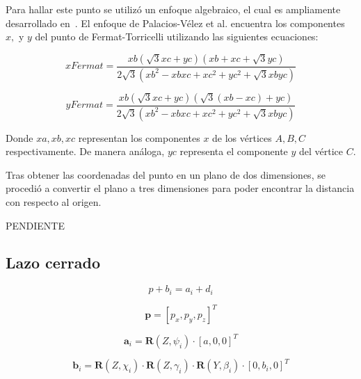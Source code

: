 \documentclass[titlepage, letterpaper, fleqn]{article}
\let\bs\mathbf
\begin{document}
Para hallar este punto se utilizó un enfoque algebraico, el cual es ampliamente desarrollado en~\cite{Palacios-Velez2015}.
El enfoque de Palacios-Vélez et al. encuentra los componentes $x,$ y $ y$ del punto de Fermat-Torricelli utilizando las siguientes ecuaciones:

\begin{equation}
    \label{eq:fermat_x}
    xFermat = \frac{xb(\sqrt{3}xc + yc)(xb + xc + \sqrt{3} yc)}{2\sqrt{3}(xb^2 - xb xc + xc^2 + yc^2 + \sqrt{3} xb yc)}
\end{equation}

\begin{equation}
    \label{eq:fermat_y}
    yFermat = \frac{xb(\sqrt{3}xc + yc)(\sqrt{3}(xb - xc) + yc)}{2\sqrt{3}(xb^2 - xb xc + xc^2 + yc^2 + \sqrt{3} xb yc)}
\end{equation}

Donde $xa, xb, xc$ representan los componentes $x$ de los vértices $A, B, C$ respectivamente.
De manera análoga, $yc$ representa el componente $y$ del vértice $C$.

Tras obtener las coordenadas del punto en un plano de dos dimensiones, se procedió a convertir el plano a tres dimensiones para poder encontrar la distancia con respecto al origen.

PENDIENTE

\subsection{Lazo cerrado} %
\label{subsec:loop_closure}


\begin{equation}
    \label{eq:loop_closure}
    p+b_i = a_i + d_i
\end{equation}

\begin{equation}
    \label{eq:p_vector}
    \bs{p} = [p_x,p_y,p_z]^T
\end{equation}

\begin{equation}
    \label{eq:a_vector}
    \bs{a}_i = \bs{R}(Z,\psi_i) \cdot [a,0,0]^T
\end{equation}

\begin{equation}
    \label{eq:b_vector}
    \bs{b}_i = \bs{R}(Z,\chi_i)\cdot \bs{R}(Z, \gamma_i) \cdot \bs{R}(Y, \beta_i) \cdot [0, b_i, 0]^T
\end{equation}
\end{document}
